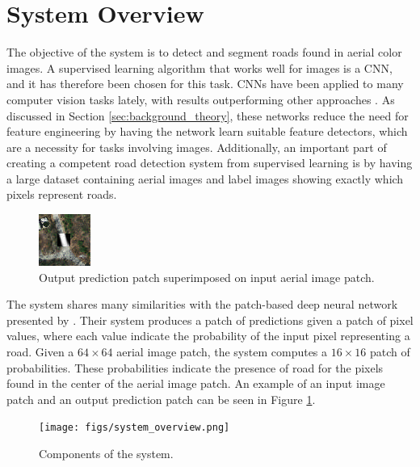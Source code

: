 \section{System Overview}
\label{sec:systemOverview}



The objective of the system is to detect and segment roads found in aerial color images. A supervised learning algorithm that works well for images is a \ac{CNN}, and it has therefore been chosen for this task. \ac{CNN}s have been applied to many computer vision tasks lately, with results outperforming other approaches \citep{Krizhevsky_imagenet}. As discussed in Section \ref{sec:background_theory}, these networks reduce the need for feature engineering by having the network learn suitable feature detectors, which are a necessity for tasks involving images. Additionally, an important part of creating a competent road detection system from supervised learning is by having a large dataset containing aerial images and label images showing exactly which pixels represent roads.\\

\begin{figure}[t]
\begin{center}
\includegraphics[width=0.15\columnwidth]{figs/labeloverlay.png}
\caption[Input patch and prediction]{Output prediction patch superimposed on input aerial image patch.}
\label{fig:system_data_patch}
\end{center}
\end{figure}

The system shares many similarities with the patch-based deep neural network presented by \cite{Mnih_aerial_images_noisy}. Their system produces a patch of predictions given a patch of pixel values, where each value indicate the probability of the input pixel representing a road. Given a $64 \times 64$ aerial image patch, the system computes a $16 \times 16$ patch of probabilities. These probabilities indicate the presence of road for the pixels found in the center of the aerial image patch. An example of an input image patch and an output prediction patch can be seen in Figure \ref{fig:system_data_patch}.  \\

\begin{figure}[t]
\begin{center}
\texttt{[image: figs/system\_overview.png]}
\caption[Components of the system]{Components of the system.}
\label{fig:system_components}
\end{center}
\end{figure}

